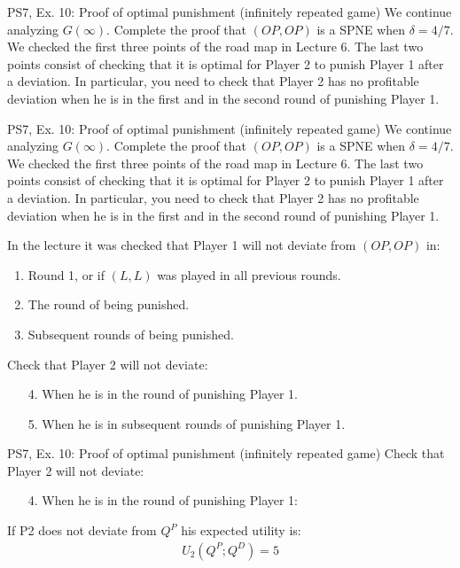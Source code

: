\begin{frame}{PS7, Ex. 10: Proof of optimal punishment (infinitely repeated game)}
    We continue analyzing $G(\infty)$. Complete the proof that $(OP,OP)$ is a SPNE when $\delta=4/7$. We checked the first three points of the road map in Lecture 6. The last two points consist of checking that it is optimal for Player 2 to punish Player 1 after a deviation. In particular, you need to check that Player 2 has no profitable deviation when he is in the first and in the second round of punishing Player 1.
    \vfill\null
\end{frame}
\begin{frame}{PS7, Ex. 10: Proof of optimal punishment (infinitely repeated game)}
    We continue analyzing $G(\infty)$. Complete the proof that $(OP,OP)$ is a SPNE when $\delta=4/7$. We checked the first three points of the road map in Lecture 6. The last two points consist of checking that it is optimal for Player 2 to punish Player 1 after a deviation. In particular, you need to check that Player 2 has no profitable deviation when he is in the first and in the second round of punishing Player 1.
  \begin{multicols}{2}
    In the lecture it was checked that Player 1 will not deviate from $(OP,OP)$ in:
    \begin{enumerate}
      \item Round 1, or if $(L,L)$ was played in all previous rounds.
      \item The  round of being punished.
      \item Subsequent rounds of being punished.
    \end{enumerate}
    \vfill\null\columnbreak
    Check that Player 2 will not deviate:
    \begin{itemize}
      \item[4.] When he is in the  round of punishing Player 1.
      \item[5.] When he is in subsequent rounds of punishing Player 1.
    \end{itemize}
    \vfill\null
  \end{multicols}
  \vfill\null
\end{frame}

\begin{frame}{PS7, Ex. 10: Proof of optimal punishment (infinitely repeated game)}
    Check that Player 2 will not deviate:
  \begin{multicols}{2}
    \begin{itemize}
      \item[4.] When he is in the  round of punishing Player 1:
    \end{itemize}
    If P2 does not deviate from $Q^P$ his expected utility is:
    \begin{align*}
      U_2(Q^P;Q^D)=5
    \end{align*}
    \vfill\null\columnbreak
    \vfill\null
  \end{multicols}
\end{frame}


